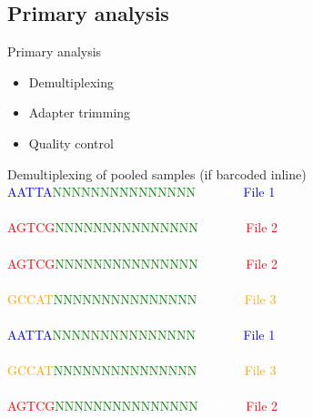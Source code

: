 \documentclass[presentation]{beamer}
\begin{document}
\subsection{Primary analysis}
\label{sec-2-1}
\begin{frame}[label=sec-2-1-1]{Primary analysis}
\begin{itemize}
\item Demultiplexing
\item Adapter trimming
\item Quality control
\end{itemize}
\end{frame}



\begin{frame}[label=sec-2-1-2]{Demultiplexing of pooled samples (if barcoded inline)}
\textcolor{blue}{AATTA}\textcolor{green}{NNNNNNNNNNNNNNN}\textcolor{white}{XXXXX}\textcolor{blue}{File 1}\\
\textcolor{white}{}\\
\textcolor{red}{AGTCG}\textcolor{green}{NNNNNNNNNNNNNNN}\textcolor{white}{XXXXX}\textcolor{red}{File 2}\\
\textcolor{white}{}\\
\textcolor{red}{AGTCG}\textcolor{green}{NNNNNNNNNNNNNNN}\textcolor{white}{XXXXX}\textcolor{red}{File 2}\\
\textcolor{white}{}\\
\textcolor{orange}{GCCAT}\textcolor{green}{NNNNNNNNNNNNNNN}\textcolor{white}{XXXXX}\textcolor{orange}{File 3}\\
\textcolor{white}{}\\
\textcolor{blue}{AATTA}\textcolor{green}{NNNNNNNNNNNNNNN}\textcolor{white}{XXXXX}\textcolor{blue}{File 1}\\
\textcolor{white}{}\\
\textcolor{orange}{GCCAT}\textcolor{green}{NNNNNNNNNNNNNNN}\textcolor{white}{XXXXX}\textcolor{orange}{File 3}\\
\textcolor{white}{}\\
\textcolor{red}{AGTCG}\textcolor{green}{NNNNNNNNNNNNNNN}\textcolor{white}{XXXXX}\textcolor{red}{File 2}\\
\end{frame}
\end{document}
